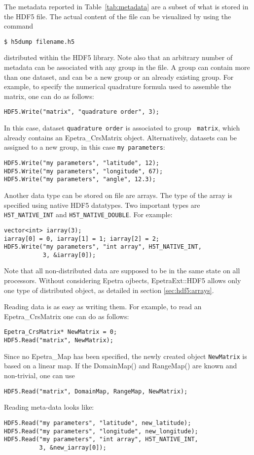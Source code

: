 \documentclass[11pt,relax]{SANDreport}
\begin{document}
The metadata reported in Table~\ref{tab:metadata} are a subset of what is
stored in the HDF5 file. The actual content of the file can be visualized by
using the command
\begin{verbatim}
$ h5dump filename.h5
\end{verbatim}
distributed within the HDF5 library. Note also that an arbitrary number of
metadata can be associated with any group in the file.  A group can contain
more than one dataset, and can be a new group or an already existing group.
For example, to specify the numerical quadrature formula used to assemble the
matrix, one can do as follows:
\begin{verbatim}
HDF5.Write("matrix", "quadrature order", 3);
\end{verbatim}
In this case, dataset {\tt quadrature order} is associated to group {\tt
  matrix}, which already contains an Epetra\_CrsMatrix object. 
Alternatively, datasets can be assigned to a new group, in this case
{\tt my parameters}:
\begin{verbatim}
HDF5.Write("my parameters", "latitude", 12);
HDF5.Write("my parameters", "longitude", 67);
HDF5.Write("my parameters", "angle", 12.3);
\end{verbatim}
Another data type can be stored on file are arrays. The type of the array is
specified using native HDF5 datatypes. Two important types are {\tt
  H5T\_NATIVE\_INT} and {\tt H5T\_NATIVE\_DOUBLE}. For example:
\begin{verbatim}
vector<int> iarray(3); 
iarray[0] = 0, iarray[1] = 1; iarray[2] = 2;
HDF5.Write("my parameters", "int array", H5T_NATIVE_INT, 
           3, &iarray[0]);
\end{verbatim}
Note that all non-distributed data are supposed to be in the same state on all
processors. Without considering Epetra ojbects, EpetraExt::HDF5 allows only
one type of distributed object, as detailed in section \ref{sec:hdf5:arrays}.

\smallskip

Reading data is as easy as writing them. For example, to read an
Epetra\_CrsMatrix one can do as follows:
\begin{verbatim}
Epetra_CrsMatrix* NewMatrix = 0;
HDF5.Read("matrix", NewMatrix);
\end{verbatim}
Since no Epetra\_Map has been specified, 
the newly created object {\tt NewMatrix} is based on a linear map. If the DomainMap() and RangeMap() are
known and non-trivial, one can use
\begin{verbatim}
HDF5.Read("matrix", DomainMap, RangeMap, NewMatrix);
\end{verbatim}
Reading meta-data looks like:
\begin{verbatim}
HDF5.Read("my parameters", "latitude", new_latitude);
HDF5.Read("my parameters", "longitude", new_longitude);
HDF5.Read("my parameters", "int array", H5T_NATIVE_INT, 
          3, &new_iarray[0]);
\end{verbatim}
\end{document}
